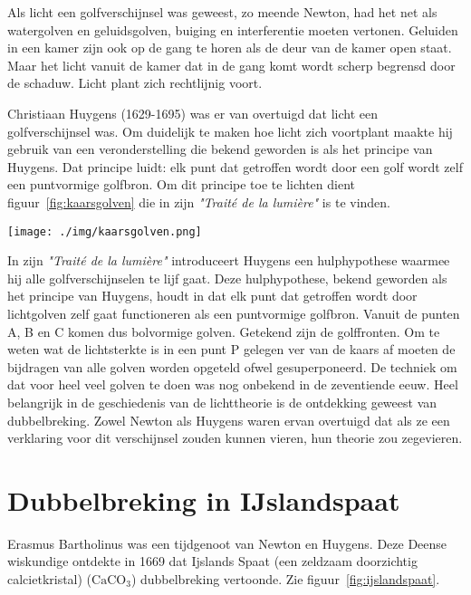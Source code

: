 {Als licht een golfverschijnsel was geweest, zo meende Newton, had het net als watergolven en geluidsgolven, buiging en interferentie moeten vertonen. Geluiden in een kamer zijn ook op de gang te horen als de deur van de kamer open staat. Maar het licht vanuit de kamer dat in de gang komt wordt scherp begrensd door de schaduw. Licht plant zich rechtlijnig voort. 

Christiaan Huygens (1629-1695) was er van overtuigd dat licht een golfverschijnsel was. Om duidelijk te maken hoe licht zich voortplant maakte hij gebruik van een veronderstelling die bekend geworden is als het principe van Huygens. Dat principe luidt: elk punt dat getroffen wordt door een golf wordt zelf een puntvormige golfbron. Om dit principe toe te lichten dient figuur~\ref{fig:kaarsgolven} die in zijn \textit{"Trait\'e de la lumi\`ere"} is te vinden.


\begin{center}
\leavevmode
\texttt{[image: ./img/kaarsgolven.png]}
\end{center}

In zijn \textit{"Trait\'e de la lumi\`ere"} introduceert Huygens een hulphypothese waarmee hij alle golfverschijnselen te lijf gaat. Deze hulphypothese, bekend geworden als het principe van Huygens, houdt in dat elk punt dat getroffen wordt door lichtgolven zelf gaat functioneren als een puntvormige golfbron. Vanuit de punten A, B en C komen dus bolvormige golven. Getekend zijn de golffronten.
Om te weten wat de lichtsterkte is in een punt P gelegen ver van de kaars af moeten de bijdragen van alle golven worden opgeteld ofwel gesuperponeerd. De techniek om dat voor heel veel golven te doen was nog onbekend in de zeventiende eeuw. 
Heel belangrijk in de geschiedenis van de lichttheorie is de ontdekking geweest van dubbelbreking. Zowel Newton als Huygens waren ervan overtuigd dat als ze een verklaring voor dit verschijnsel zouden kunnen vieren, hun theorie zou zegevieren. 

\section{Dubbelbreking in IJslandspaat}
Erasmus Bartholinus was een tijdgenoot van Newton en Huygens. Deze Deense wiskundige ontdekte in 1669 dat Ijslands Spaat (een zeldzaam doorzichtig calcietkristal) ($\mathrm{CaCO_3}$) dubbelbreking vertoonde. Zie figuur~\ref{fig:ijslandspaat}.


}
